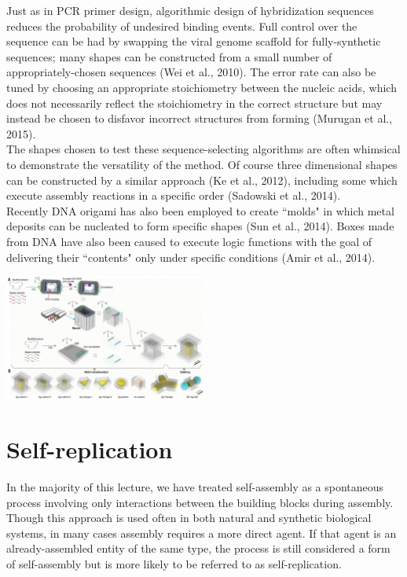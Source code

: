 \documentclass{article}
\begin{document}
Just as in PCR primer design, algorithmic design of hybridization sequences reduces the probability of undesired binding events. Full control over the sequence can be had by swapping the viral genome scaffold for fully-synthetic sequences; many shapes can be constructed from a small number of appropriately-chosen sequences (Wei et al., 2010). The error rate can also be tuned by choosing an appropriate stoichiometry between the nucleic acids, which does not necessarily reflect the stoichiometry in the correct structure but may instead be chosen to disfavor incorrect structures from forming (Murugan et al., 2015).\\

The shapes chosen to test these sequence-selecting algorithms are often whimsical to demonstrate the versatility of the method. Of course three dimensional shapes can be constructed by a similar approach (Ke et al., 2012), including some which execute assembly reactions in a specific order (Sadowski et al., 2014).\\

Recently DNA origami has also been employed to create ``molds" in which metal deposits can be nucleated to form specific shapes (Sun et al., 2014). Boxes made from DNA have also been caused to execute logic functions with the goal of delivering their ``contents" only under specific conditions (Amir et al., 2014).

\begin{center}
\includegraphics[width=0.5\textwidth]{mold.pdf}
\end{center}

\section*{Self-replication}

In the majority of this lecture, we have treated self-assembly as a spontaneous process involving only interactions between the building blocks during assembly. Though this approach is used often in both natural and synthetic biological systems, in many cases assembly requires a more direct agent. If that agent is an already-assembled entity of the same type, the process is still considered a form of self-assembly but is more likely to be referred to as self-replication.\\
\end{document}
